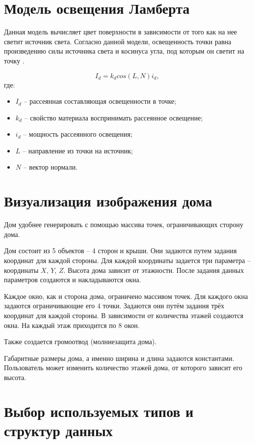 \section{Модель освещения Ламберта}

Данная модель вычисляет цвет поверхности в зависимости от того как на нее светит источник света. Согласно данной модели, освещенность точки равна произведению силы источника света и косинуса угла, под которым он светит на точку \cite{lamber_fong}.

\begin{equation}
	\label{eq:lambert}
	I_{d} = k_{d}  cos(L, N)  i_{d},
\end{equation}
где:
\begin{itemize}
	\item $I_{d}$ -- рассеянная составляющая освещенности в точке;
	\item $k_{d}$ -- свойство материала воспринимать рассеянное освещение;
	\item $i_{d}$ -- мощность рассеянного освещения;
	\item $L$ -- направление из точки на источник;
	\item $N$ -- вектор нормали.
\end{itemize}

\section{Визуализация изображения дома}
Дом удобнее генерировать с помощью массива точек, ограничивающих сторону дома.

Дом состоит из 5 объектов – 4 сторон и крыши. Они задаются путем задания координат для каждой стороны. Для каждой координаты задается три параметра – координаты $X$, $Y$, $Z$. Высота дома зависит от этажности. После задания данных параметров создаются и накладываются окна. 

Каждое окно, как и сторона дома, ограничено массивом точек. Для каждого окна задаются ограничивающие его 4 точки. Задаются они путём задания трёх координат для каждой стороны. В зависимости от количества этажей создаются окна. На каждый этаж приходится по 8 окон. 

Также создается громоотвод (молниезащита дома). 

Габаритные размеры дома, а именно ширина и длина задаются константами. Пользователь может изменить количество этажей дома, от которого зависит его высота.

\section{Выбор используемых типов и структур данных} 

